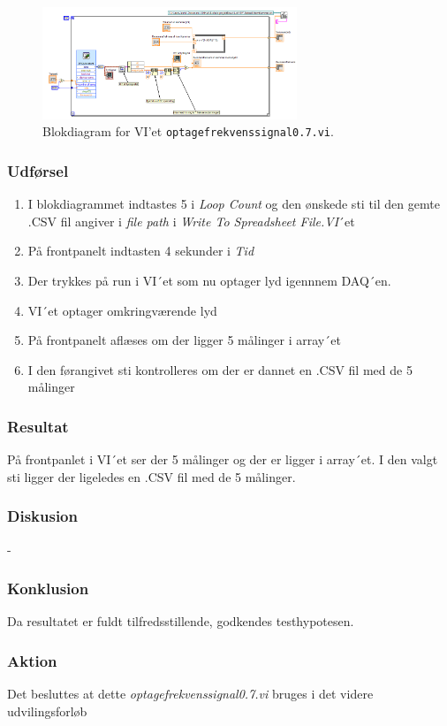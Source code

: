 		\begin{figure}[htb]

			\centering
			\includegraphics[width=3in]{VI07o}
			\caption{Blokdiagram for VI'et \texttt{optagefrekvenssignal0.7.vi}.}
			\label{fig:vio5}
		\end{figure}

\subsubsection{Udførsel}
\begin{enumerate}
			\item I blokdiagrammet indtastes 5 i \textit{Loop Count} og den ønskede sti til den gemte .CSV fil angiver i \textit{file path} i \textit{Write To Spreadsheet File.VI}´et	
			\item På frontpanelt indtasten 4 sekunder i \textit{Tid} 		
			\item Der trykkes på run i VI´et som nu optager lyd igennnem DAQ´en.
			\item VI´et optager omkringværende lyd
			\item På frontpanelt aflæses om der ligger 5 målinger i array´et
			\item I den førangivet sti kontrolleres om der er dannet en .CSV fil med de 5 målinger 
			\end{enumerate}

\subsubsection{Resultat}
På frontpanlet i VI´et ser der 5 målinger og der er ligger i array´et. 
I den valgt sti ligger der ligeledes en .CSV fil med de 5 målinger.
\subsubsection{Diskusion}
-
\subsubsection{Konklusion}
Da resultatet er fuldt tilfredsstillende, godkendes testhypotesen. 
 \subsubsection{Aktion}
Det besluttes at dette \textit{optagefrekvenssignal0.7.vi} bruges i det videre udvilingsforløb

